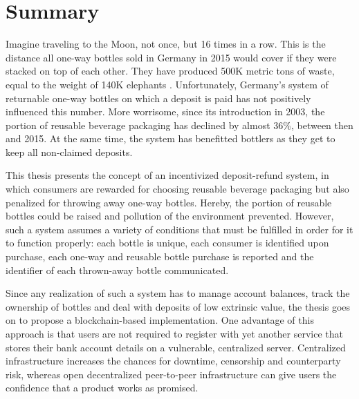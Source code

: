 
\chapter{Summary}
\label{chp:summary}

Imagine traveling to the Moon, not once, but 16 times in a row. This is the distance all one-way bottles sold in Germany in 2015 would cover if they were stacked on top of each other. They have produced 500K metric tons of waste, equal to the weight of 140K elephants \cite{duh2017}. Unfortunately, Germany's system of returnable one-way bottles on which a deposit is paid has not positively influenced this number. More worrisome, since its introduction in 2003, the portion of reusable beverage packaging has declined by almost 36\%, between then and 2015. At the same time, the system has benefitted bottlers as they get to keep all non-claimed deposits.

This thesis presents the concept of an incentivized deposit-refund system, in which consumers are rewarded for choosing reusable beverage packaging but also penalized for throwing away one-way bottles. Hereby, the portion of reusable bottles could be raised and pollution of the environment prevented. However, such a system assumes a variety of conditions that must be fulfilled in order for it to function properly: each bottle is unique, each consumer is identified upon purchase,  each one-way and reusable bottle purchase is reported and the identifier of each thrown-away bottle communicated.


Since any realization of such a system has to manage account balances, track the ownership of bottles and deal with deposits of low extrinsic value, the thesis goes on to propose a blockchain-based implementation. One advantage of this approach is that users are not required to register with yet another service that stores their bank account details on a vulnerable, centralized server. Centralized infrastructure increases the chances for downtime, censorship and counterparty risk, whereas open decentralized peer-to-peer infrastructure can give users the confidence that a product works as promised.

